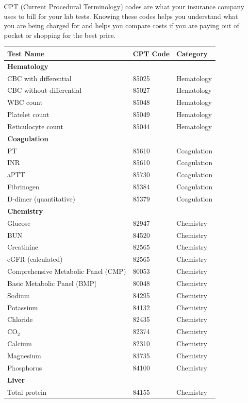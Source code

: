 CPT (Current Procedural Terminology) codes are what your insurance company uses to bill for your lab tests. Knowing these codes helps you understand what you are being charged for and helps you compare costs if you are paying out of pocket or shopping for the best price.

\begin{longtable}{@{}p{5.5cm}p{2.5cm}p{2.5cm}@{}}
\toprule
\textbf{Test Name} & \textbf{CPT Code} & \textbf{Category} \\
\midrule
\endhead
\textbf{Hematology} & & \\
CBC with differential & 85025 & Hematology \\
CBC without differential & 85027 & Hematology \\
WBC count & 85048 & Hematology \\
Platelet count & 85049 & Hematology \\
Reticulocyte count & 85044 & Hematology \\
\textbf{Coagulation} & & \\
PT & 85610 & Coagulation \\
INR & 85610 & Coagulation \\
aPTT & 85730 & Coagulation \\
Fibrinogen & 85384 & Coagulation \\
D-dimer (quantitative) & 85379 & Coagulation \\
\textbf{Chemistry} & & \\
Glucose & 82947 & Chemistry \\
BUN & 84520 & Chemistry \\
Creatinine & 82565 & Chemistry \\
eGFR (calculated) & 82565 & Chemistry \\
Comprehensive Metabolic Panel (CMP) & 80053 & Chemistry \\
Basic Metabolic Panel (BMP) & 80048 & Chemistry \\
Sodium & 84295 & Chemistry \\
Potassium & 84132 & Chemistry \\
Chloride & 82435 & Chemistry \\
CO$_2$ & 82374 & Chemistry \\
Calcium & 82310 & Chemistry \\
Magnesium & 83735 & Chemistry \\
Phosphorus & 84100 & Chemistry \\
\textbf{Liver} & & \\
Total protein & 84155 & Chemistry \\

\end{longtable}
